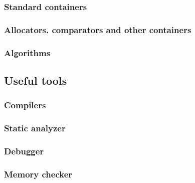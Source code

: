 \subsubsection[Containers]{Standard containers}
\subsubsection[Customization]{Allocators. comparators and other containers}
\subsubsection{Algorithms}

\subsection[Tools]{Useful tools}
\subsubsection{Compilers}
\subsubsection{Static analyzer}
\subsubsection{Debugger}
\subsubsection{Memory checker}

